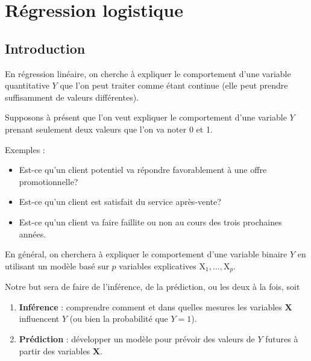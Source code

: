 \documentclass[
  11pt,
  letterpaper,
]{scrbook}
\providecommand{\tightlist}{%
  \setlength{\itemsep}{0pt}\setlength{\parskip}{0pt}}\usepackage{longtable,booktabs,array}
\theoremstyle{definition}
\theoremstyle{remark}
\begin{document}
\begin{tcolorbox}
\end{tcolorbox}


\hypertarget{regression-logistique}{%
\chapter{Régression logistique}\label{regression-logistique}}

\hypertarget{introduction-1}{%
\section{Introduction}\label{introduction-1}}

En régression linéaire, on cherche à expliquer le comportement d'une
variable quantitative \(Y\) que l'on peut traiter comme étant continue
(elle peut prendre suffisamment de valeurs différentes).

Supposons à présent que l'on veut expliquer le comportement d'une
variable \(Y\) prenant seulement deux valeurs que l'on va noter 0 et 1.

Exemples :

\begin{itemize}
\tightlist
\item
  Est-ce qu'un client potentiel va répondre favorablement à une offre
  promotionnelle?
\item
  Est-ce qu'un client est satisfait du service après-vente?
\item
  Est-ce qu'un client va faire faillite ou non au cours des trois
  prochaines années.
\end{itemize}

En général, on cherchera à expliquer le comportement d'une variable
binaire \(Y\) en utilisant un modèle basé sur \(p\) variables
explicatives \(\mathrm{X}_1, \ldots, \mathrm{X}_p\).

Notre but sera de faire de l'inférence, de la prédiction, ou les deux à
la fois, soit

\begin{enumerate}
\def\labelenumi{\arabic{enumi})}
\tightlist
\item
  \textbf{Inférence} : comprendre comment et dans quelles mesures les
  variables \(\mathbf{X}\) influencent \(Y\) (ou bien la probabilité que
  \(Y=1\)).
\item
  \textbf{Prédiction} : développer un modèle pour prévoir des valeurs de
  \(Y\) futures à partir des variables \(\mathbf{X}\).
\end{enumerate}
\end{document}
